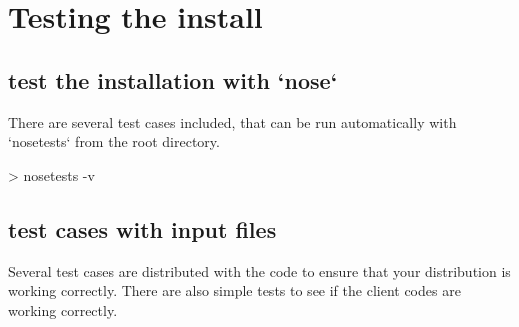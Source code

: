 \documentclass[11pt,english,fleqn]{report}
\newenvironment{code}{%
\footnotesize
\verbatim
}{
\endverbatim
\normalsize
}
\begin{document}
\section{Testing the install}

\label{tests}

\subsection{test the installation with `nose`}

There are several test cases included, that can be run automatically with
`nosetests` from the root directory.

\begin{code}
> nosetests -v
\end{code}

\subsection{test cases with input files}

Several test cases are distributed with the code to ensure that your
distribution is working correctly. There are also simple tests to
see if the client codes are working correctly.
\end{document}
